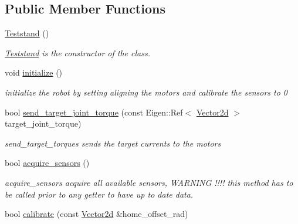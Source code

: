 \subsection*{Public Member Functions}
\begin{DoxyCompactItemize}
\item 
\hyperlink{classblmc__robots_1_1Teststand_a4747b0754cd3dd669c02f27662baef7e}{Teststand} ()
\begin{DoxyCompactList}\small\item\em \hyperlink{classblmc__robots_1_1Teststand}{Teststand} is the constructor of the class. \end{DoxyCompactList}\item 
\mbox{\label{classblmc__robots_1_1Teststand_aa41ad951a8259fd15e6309e850a6084a}} 
void \hyperlink{classblmc__robots_1_1Teststand_aa41ad951a8259fd15e6309e850a6084a}{initialize} ()
\begin{DoxyCompactList}\small\item\em initialize the robot by setting aligning the motors and calibrate the sensors to 0 \end{DoxyCompactList}\item 
\mbox{\label{classblmc__robots_1_1Teststand_aabb484d65bca5a341dd24abd91c47b9b}} 
bool \hyperlink{classblmc__robots_1_1Teststand_aabb484d65bca5a341dd24abd91c47b9b}{send\+\_\+target\+\_\+joint\+\_\+torque} (const Eigen\+::\+Ref$<$ \hyperlink{common__header_8hpp_acb6916bc8c9fe9d98c484fd4cc201447}{Vector2d} $>$ target\+\_\+joint\+\_\+torque)
\begin{DoxyCompactList}\small\item\em send\+\_\+target\+\_\+torques sends the target currents to the motors \end{DoxyCompactList}\item 
bool \hyperlink{classblmc__robots_1_1Teststand_a4203e25148ab5b4ddfef3b46647213c6}{acquire\+\_\+sensors} ()
\begin{DoxyCompactList}\small\item\em acquire\+\_\+sensors acquire all available sensors, W\+A\+R\+N\+I\+NG !!!! this method has to be called prior to any getter to have up to date data. \end{DoxyCompactList}\item 
bool \hyperlink{classblmc__robots_1_1Teststand_ad4660570e3e1b77717004b3ce8056faf}{calibrate} (const \hyperlink{common__header_8hpp_acb6916bc8c9fe9d98c484fd4cc201447}{Vector2d} \&home\+\_\+offset\+\_\+rad)

\end{DoxyCompactItemize}
